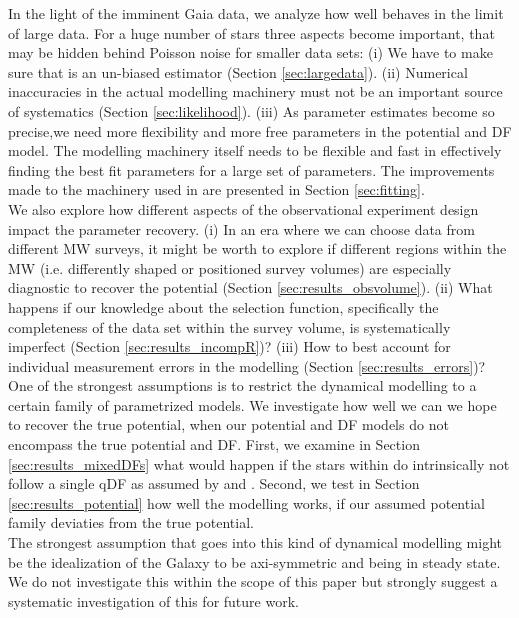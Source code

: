 In the light of the imminent Gaia data, we analyze how well \RM{} behaves in the limit of large data. For a huge number of stars three aspects become important, that may be hidden behind Poisson noise for smaller data sets: (i) We have to make sure that \RM{} is an un-biased estimator (Section \ref{sec:largedata}). (ii) Numerical inaccuracies in the actual modelling machinery must not be an important source of systematics (Section \ref{sec:likelihood}). (iii) As parameter estimates become so precise,we need more flexibility and more free parameters in the potential and DF model. The modelling machinery itself needs to be flexible and fast in effectively finding the best fit parameters for a large set of parameters. The improvements made to the machinery used in \citet{bov13} are presented in Section \ref{sec:fitting}. \\

We also explore how different aspects of the observational experiment design impact the parameter recovery. (i) In an era where we can choose data from different MW surveys, it might be worth to explore if different regions within the MW (i.e. differently shaped or positioned survey volumes) are especially diagnostic to recover the potential (Section \ref{sec:results_obsvolume}). (ii) What happens if our knowledge about the selection function, specifically the completeness of the data set within the survey volume, is systematically imperfect (Section \ref{sec:results_incompR})? (iii) How to best account for individual measurement errors in the modelling (Section \ref{sec:results_errors})? \\

One of the strongest assumptions is to restrict the dynamical modelling to a certain family of parametrized models. We investigate how well we can we hope to recover the true potential, when our potential and DF models do not encompass the true potential and DF. First, we examine in Section \ref{sec:results_mixedDFs} what would happen if the stars within \MAPs{} do intrinsically not follow a single qDF as assumed by \citet{tin13} and \citet{bov13}. Second, we test in Section \ref{sec:results_potential} how well the modelling works, if our assumed potential family deviaties from the true potential.\\

The strongest assumption that goes into this kind of dynamical modelling might be the idealization of the Galaxy to be axi-symmetric and being in steady state. We do not investigate this within the scope of this paper but strongly suggest a systematic investigation of this for future work.\\

